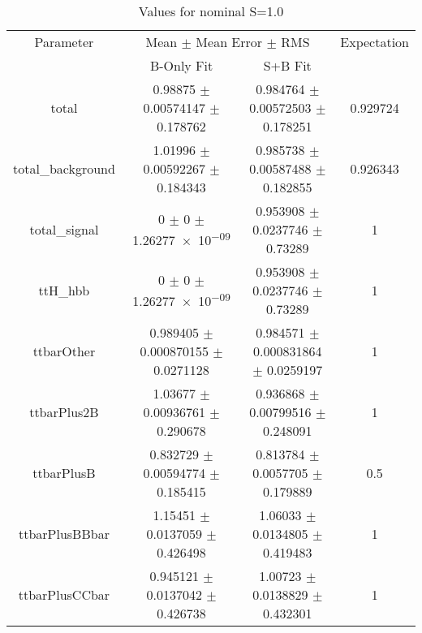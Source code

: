 \begin{table}
\centering
\caption{Values for nominal S=1.0}
\begin{tabular}{cccc}
\toprule
Parameter & \multicolumn{2}{c}{Mean $\pm$ Mean Error $\pm$ RMS} & Expectation\\
 & B-Only Fit & S+B Fit & \\
\midrule
total & \num{0.98875} $\pm$ \num{0.00574147} $\pm$ \num{0.178762} & \num{0.984764} $\pm$ \num{0.00572503} $\pm$ \num{0.178251} & \num{0.929724}\\
total\_background & \num{1.01996} $\pm$ \num{0.00592267} $\pm$ \num{0.184343} & \num{0.985738} $\pm$ \num{0.00587488} $\pm$ \num{0.182855} & \num{0.926343}\\
total\_signal & \num{0} $\pm$ \num{0} $\pm$ \num{1.26277e-09} & \num{0.953908} $\pm$ \num{0.0237746} $\pm$ \num{0.73289} & \num{1}\\
ttH\_hbb & \num{0} $\pm$ \num{0} $\pm$ \num{1.26277e-09} & \num{0.953908} $\pm$ \num{0.0237746} $\pm$ \num{0.73289} & \num{1}\\
ttbarOther & \num{0.989405} $\pm$ \num{0.000870155} $\pm$ \num{0.0271128} & \num{0.984571} $\pm$ \num{0.000831864} $\pm$ \num{0.0259197} & \num{1}\\
ttbarPlus2B & \num{1.03677} $\pm$ \num{0.00936761} $\pm$ \num{0.290678} & \num{0.936868} $\pm$ \num{0.00799516} $\pm$ \num{0.248091} & \num{1}\\
ttbarPlusB & \num{0.832729} $\pm$ \num{0.00594774} $\pm$ \num{0.185415} & \num{0.813784} $\pm$ \num{0.0057705} $\pm$ \num{0.179889} & \num{0.5}\\
ttbarPlusBBbar & \num{1.15451} $\pm$ \num{0.0137059} $\pm$ \num{0.426498} & \num{1.06033} $\pm$ \num{0.0134805} $\pm$ \num{0.419483} & \num{1}\\
ttbarPlusCCbar & \num{0.945121} $\pm$ \num{0.0137042} $\pm$ \num{0.426738} & \num{1.00723} $\pm$ \num{0.0138829} $\pm$ \num{0.432301} & \num{1}\\
\bottomrule
\end{tabular}
\end{table}